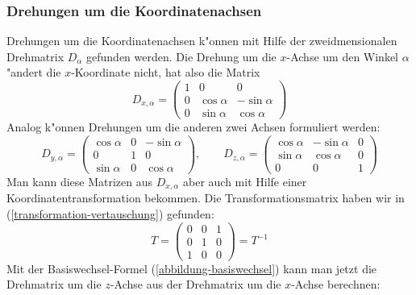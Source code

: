 \subsubsection{Drehungen um die Koordinatenachsen}
Drehungen um die Koordinatenachsen k"onnen mit Hilfe der zweidmensionalen
Drehmatrix $D_\alpha$ gefunden werden.
Die Drehung um die $x$-Achse um den
Winkel $\alpha$ "andert die $x$-Koordinate nicht, hat also die
Matrix
\[
D_{x,\alpha}=
\begin{pmatrix}
1&0&0\\
0&\cos\alpha&-\sin\alpha\\
0&\sin\alpha&\cos\alpha
\end{pmatrix}
\]
Analog k"onnen Drehungen um die anderen zwei Achsen formuliert werden:
\[
D_{y,\alpha}=\begin{pmatrix}
\cos\alpha&0&-\sin\alpha\\
0&1&0\\
\sin\alpha&0&\cos\alpha
\end{pmatrix}
,\qquad
D_{z,\alpha}=\begin{pmatrix}
\cos\alpha&-\sin\alpha&0\\
\sin\alpha&\cos\alpha&0\\
0&0&1
\end{pmatrix}
\]
Man kann diese Matrizen aus $D_{x,\alpha}$ aber auch mit Hilfe einer
Koordinatentransformation bekommen.
Die Transformationsmatrix
haben wir in (\ref{transformation-vertauschung}) gefunden:
\[
T=
\begin{pmatrix}
0&0&1\\
0&1&0\\
1&0&0
\end{pmatrix}
=T^{-1}
\]
Mit der Basiswechsel-Formel (\ref{abbildung-basiswechsel}) kann
man jetzt die Drehmatrix um die $z$-Achse aus der Drehmatrix um die
$x$-Achse berechnen:
